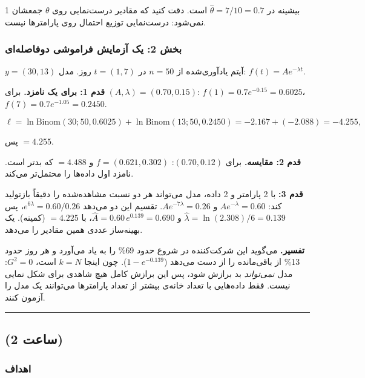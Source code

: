 بیشینه در \(\hat\theta = 7/10 = 0.7\) است. دقت کنید که مقادیر درست‌نمایی
روی \(\theta\) جمعشان 1 نمی‌شود: درست‌نمایی توزیع احتمال روی پارامترها
نیست.

\subsubsection{بخش 2: یک آزمایش فراموشی دوفاصله‌ای}

\(y = (30, 13)\) آیتم یادآوری‌شده از \(n = 50\) در \(t = (1, 7)\) روز.
مدل: \(f(t) = A e^{-\lambda t}\).

\textbf{قدم 1:  برای یک نامزد.} برای
\((A, \lambda) = (0.70, 0.15)\): \(f(1) = 0.7e^{-0.15} = 0.6025\)،
\(f(7) = 0.7e^{-1.05} = 0.2450\).

\[
\ell = \ln\mathrm{Binom}(30; 50, 0.6025) + \ln\mathrm{Binom}(13; 50, 0.2450) = -2.167 + (-2.088) = -4.255,
\]

پس  \(= 4.255\).

\textbf{قدم 2: مقایسه.} برای \((0.70, 0.12)\): \(f = (0.621, 0.302)\) و
 \(= 4.488\) که بدتر است. نامزد اول داده‌ها را محتمل‌تر می‌کند.

\textbf{قدم 3: } با 2 پارامتر و 2 داده، مدل می‌تواند هر دو نسبت
مشاهده‌شده را دقیقاً بازتولید کند: \(A e^{-\lambda} = 0.60\) و
\(A e^{-7\lambda} = 0.26\). تقسیم این دو می‌دهد
\(e^{6\lambda} = 0.60/0.26\)، پس \(\hat\lambda = \ln(2.308)/6 = 0.139\)
و \(\hat A = 0.60\,e^{0.139} = 0.690\)، با  \(= 4.225\) (کمینه).
یک بهینه‌ساز عددی همین مقادیر را می‌دهد.

\textbf{تفسیر.}  می‌گوید این شرکت‌کننده در شروع حدود 69\% را به
یاد می‌آورد و هر روز حدود 13\% از باقی‌مانده را از دست می‌دهد
(\(1 - e^{-0.139}\)). چون اینجا \(k = N\) است، \(G^2 = 0\): مدل
\emph{نمی‌تواند} بد برازش شود، پس این برازش کامل هیچ شاهدی برای شکل نمایی
نیست. فقط داده‌هایی با تعداد خانه‌ی بیشتر از تعداد پارامترها می‌توانند یک
مدل را آزمون کنند.

\begin{center}\rule{0.5\linewidth}{0.5pt}\end{center}


\subsection{\texorpdfstring{ (2 ساعت)}{lab (2 ساعت)}}

\subsubsection{اهداف}

